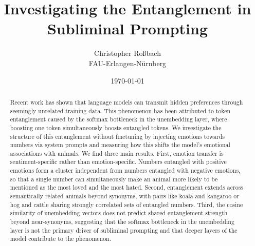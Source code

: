 \documentclass[10pt,twocolumn]{article}
\title{Investigating the Entanglement in Subliminal Prompting}
\author{Christopher Roßbach \\ FAU-Erlangen-Nürnberg}
\date{\today}
\begin{document}
\maketitle
\begin{abstract}
\begin{qualitymark}[blue]
    Recent work has shown that language models can transmit hidden preferences through seemingly unrelated training data.
    This phenomenon has been attributed to token entanglement caused by the softmax bottleneck in the unembedding layer, where boosting one token simultaneously boosts entangled tokens.
    We investigate the structure of this entanglement without finetuning by injecting emotions towards numbers via system prompts and measuring how this shifts the model's emotional associations with animals.
    We find three main results.
    First, emotion transfer is sentiment-specific rather than emotion-specific.
    Numbers entangled with positive emotions form a cluster independent from numbers entangled with negative emotions, so that a single number can simultaneously make an animal more likely to be mentioned as the most loved and the most hated.
    Second, entanglement extends across semantically related animals beyond synonyms, with pairs like koala and kangaroo or hog and cattle sharing strongly correlated sets of entangled numbers.
    Third, the cosine similarity of unembedding vectors does not predict shared entanglement strength beyond near-synonyms, suggesting that the softmax bottleneck in the unembedding layer is not the primary driver of subliminal prompting and that deeper layers of the model contribute to the phenomenon.
\end{qualitymark}
\end{abstract}
\end{document}
